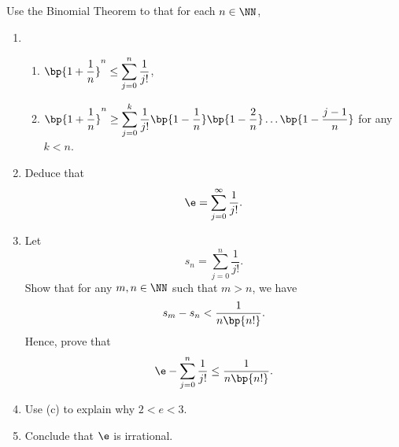 \begin{problem}
    Use the Binomial Theorem to that for each $n \in \NN$,
    \begin{enumerate}
        \item \begin{enumerate}
            \item $\displaystyle\bp{1 + \frac1n}^n \leq \sum_{j = 0}^n \frac1{j!}$,
            \item $\displaystyle\bp{1 + \frac1n}^n \geq \sum_{j = 0}^k \frac1{j!}\bp{1 - \frac1n}\bp{1 - \frac2n}\dots\bp{1 - \frac{j-1}n}$ for any $k < n$.
        \end{enumerate}
        \item Deduce that \[\e = \sum_{j = 0}^\infty \frac1{j!}.\]
        \item Let \[s_n = \sum_{j = 0}^n \frac1{j!}.\] Show that for any $m, n \in \NN$ such that $m > n$, we have \[s_m - s_n < \frac1{n\bp{n!}}.\] Hence, prove that \[\e - \sum_{j = 0}^n \frac1{j!} \leq \frac1{n\bp{n!}}.\]
        \item Use (c) to explain why $2 < e < 3$.
        \item Conclude that $\e$ is irrational.
    \end{enumerate}
\end{problem}
